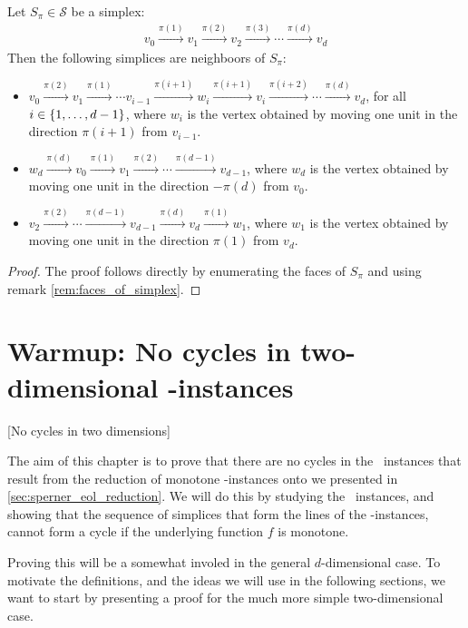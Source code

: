 \begin{lemma}
	Let $S_{\pi} \in \mathcal{S}$ be a simplex:
	\begin{align*}
		v_0 \xrightarrow{\pi(1)} v_1 \xrightarrow{\pi(2)} v_2 \xrightarrow{\pi(3)} \cdots \xrightarrow{\pi(d)} v_d
	\end{align*}
	Then the following simplices are neighboors of $S_{\pi}$:
	\begin{itemize}
		\item $v_0 \xrightarrow{\pi(2)} v_1 \xrightarrow{\pi(1)} \cdots v_{i-1} \xrightarrow{\pi(i+1)} w_i \xrightarrow{\pi(i+1)} v_{i} \xrightarrow{\pi(i+2)} \cdots \xrightarrow{\pi(d)} v_d$, for all $i \in \left\{1, \dots, d-1\right\}$, where $w_i$ is the vertex obtained by moving one unit in the direction $\pi(i+1)$ from $v_{i-1}$.
		\item $w_d \xrightarrow{\pi(d)} v_0 \xrightarrow{\pi(1)} v_1 \xrightarrow{\pi(2)} \cdots \xrightarrow{\pi(d-1)} v_{d-1}$, where $w_d$ is the vertex obtained by moving one unit in the direction $-\pi(d)$ from $v_{0}$.
		\item $v_2 \xrightarrow{\pi(2)} \cdots \xrightarrow{\pi(d-1)} v_{d-1} \xrightarrow{\pi(d)} v_d \xrightarrow{\pi(1)} w_1$, where $w_1$ is the vertex obtained by moving one unit in the direction $\pi(1)$ from $v_d$.
	\end{itemize}
\end{lemma}
\begin{proof}
	The proof follows directly by enumerating the faces of $S_{\pi}$ and using remark \ref{rem:faces_of_simplex}.
\end{proof}

\section{Warmup: No cycles in two-dimensional \Tarskistar-instances}[No cycles in two dimensions]

The aim of this chapter is to prove that there are no cycles in the \EndOfLine\ instances that result from the reduction of monotone \Tarskistar-instances onto \EndOfLine we presented in \cref{sec:sperner_eol_reduction}. We will do this by studying the \Sperner\ instances, and showing that the sequence of simplices that form the lines of the \EndOfLine-instances, cannot form a cycle if the underlying function $f$ is monotone.

Proving this will be a somewhat involed in the general $d$-dimensional case. To motivate the definitions, and the ideas we will use in the following sections, we want to start by presenting a proof for the much more simple two-dimensional case.

